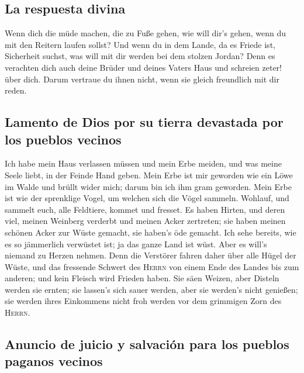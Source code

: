 \hypertarget{la-respuesta-divina}{%
\subsection{La respuesta divina}\label{la-respuesta-divina}}

 Wenn dich die müde machen, die zu Fuße gehen, wie will
dir's gehen, wenn du mit den Reitern laufen sollst? Und wenn du in dem
Lande, da es Friede ist, Sicherheit suchst, was will mit dir werden bei
dem stolzen Jordan?  Denn es verachten dich auch deine
Brüder und deines Vaters Haus und schreien zeter! über dich. Darum
vertraue du ihnen nicht, wenn sie gleich freundlich mit dir reden.

\hypertarget{lamento-de-dios-por-su-tierra-devastada-por-los-pueblos-vecinos}{%
\subsection{Lamento de Dios por su tierra devastada por los pueblos
vecinos}\label{lamento-de-dios-por-su-tierra-devastada-por-los-pueblos-vecinos}}

 Ich habe mein Haus verlassen müssen und mein Erbe meiden,
und was meine Seele liebt, in der Feinde Hand geben.  Mein
Erbe ist mir geworden wie ein Löwe im Walde und brüllt wider mich; darum
bin ich ihm gram geworden.  Mein Erbe ist wie der
sprenklige Vogel, um welchen sich die Vögel sammeln. Wohlauf, und
sammelt euch, alle Feldtiere, kommet und fresset.  Es
haben Hirten, und deren viel, meinen Weinberg verderbt und meinen Acker
zertreten; sie haben meinen schönen Acker zur Wüste gemacht, sie haben's
öde gemacht.  Ich sehe bereits, wie es so jämmerlich
verwüstet ist; ja das ganze Land ist wüst. Aber es will's niemand zu
Herzen nehmen.  Denn die Verstörer fahren daher über alle
Hügel der Wüste, und das fressende Schwert des \textsc{Herrn} von einem
Ende des Landes bis zum anderen; und kein Fleisch wird Frieden haben.
 Sie säen Weizen, aber Disteln werden sie ernten; sie
lassen's sich sauer werden, aber sie werden's nicht genießen; sie werden
ihres Einkommens nicht froh werden vor dem grimmigen Zorn des
\textsc{Herrn}.

\hypertarget{anuncio-de-juicio-y-salvaciuxf3n-para-los-pueblos-paganos-vecinos}{%
\subsection{Anuncio de juicio y salvación para los pueblos paganos
vecinos}\label{anuncio-de-juicio-y-salvaciuxf3n-para-los-pueblos-paganos-vecinos}}

